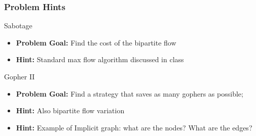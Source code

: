 \begin{frame}
  \frametitle{Problem Hints}
  \begin{block}{Sabotage}
    \begin{itemize}
    \item {\bf Problem Goal:} Find the cost of the bipartite flow
    \item {\bf Hint:} Standard max flow algorithm discussed in class
    \end{itemize}
  \end{block}

  \begin{exampleblock}{Gopher II}
    \begin{itemize}
    \item {\bf Problem Goal:} Find a strategy that saves as many gophers as possible;
    \item {\bf Hint:} Also bipartite flow variation
    \item {\bf Hint:} Example of Implicit graph: what are the nodes?
      What are the edges?
    \end{itemize}
  \end{exampleblock}
\end{frame}
